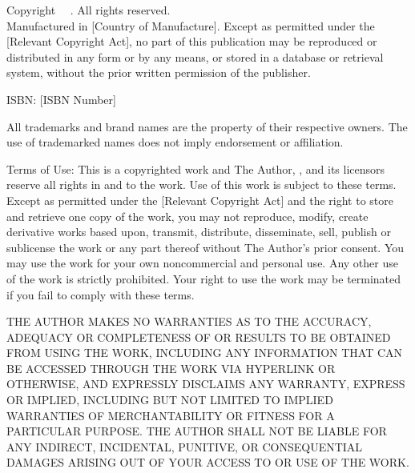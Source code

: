 \newpage
\thispagestyle{empty}
\begin{center}
	\textbf{\publisher}
\end{center}

\vfill

\noindent Copyright \textcopyright\ \copyrightyear\ \copyrightowner. All rights reserved.\\
Manufactured in [Country of Manufacture]. Except as permitted under the [Relevant Copyright Act], no part of this publication may be reproduced or distributed in any form or by any means, or stored in a database or retrieval system, without the prior written permission of the publisher.

\noindent ISBN: [ISBN Number]

\noindent All trademarks and brand names are the property of their respective owners. The use of trademarked names does not imply endorsement or affiliation.

\vspace{1cm}

\noindent Terms of Use: This is a copyrighted work and The Author, \copyrightowner, and its licensors reserve all rights in and to the work. Use of this work is subject to these terms. Except as permitted under the [Relevant Copyright Act] and the right to store and retrieve one copy of the work, you may not reproduce, modify, create derivative works based upon, transmit, distribute, disseminate, sell, publish or sublicense the work or any part thereof without The Author's prior consent. You may use the work for your own noncommercial and personal use. Any other use of the work is strictly prohibited. Your right to use the work may be terminated if you fail to comply with these terms.

\vspace{1cm}

\noindent THE AUTHOR MAKES NO WARRANTIES AS TO THE ACCURACY, ADEQUACY OR COMPLETENESS OF OR RESULTS TO BE OBTAINED FROM USING THE WORK, INCLUDING ANY INFORMATION THAT CAN BE ACCESSED THROUGH THE WORK VIA HYPERLINK OR OTHERWISE, AND EXPRESSLY DISCLAIMS ANY WARRANTY, EXPRESS OR IMPLIED, INCLUDING BUT NOT LIMITED TO IMPLIED WARRANTIES OF MERCHANTABILITY OR FITNESS FOR A PARTICULAR PURPOSE. THE AUTHOR SHALL NOT BE LIABLE FOR ANY INDIRECT, INCIDENTAL, PUNITIVE, OR CONSEQUENTIAL DAMAGES ARISING OUT OF YOUR ACCESS TO OR USE OF THE WORK.

\vfill
\newpage